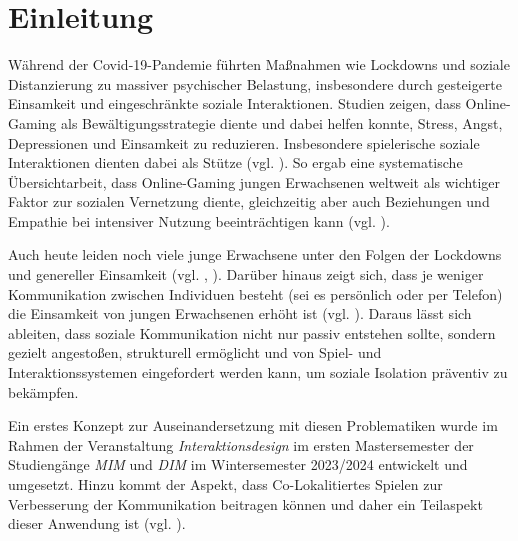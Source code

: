 \chapter{Einleitung}



Während der Covid-19-Pandemie führten Maßnahmen wie Lockdowns und soziale Distanzierung zu massiver psychischer Belastung, insbesondere durch gesteigerte Einsamkeit und eingeschränkte soziale Interaktionen. Studien zeigen, dass Online-Gaming als Bewältigungsstrategie diente und dabei helfen konnte, Stress, Angst, Depressionen und Einsamkeit zu reduzieren. Insbesondere spielerische soziale Interaktionen dienten dabei als Stütze (vgl. \cite{lewinson_gaming_2023}). So ergab eine systematische Übersichtarbeit, dass Online-Gaming jungen Erwachsenen weltweit als wichtiger Faktor zur sozialen Vernetzung diente, gleichzeitig aber auch Beziehungen und Empathie bei intensiver Nutzung beeinträchtigen kann (vgl. \cite{park_global_2025}). 

Auch heute leiden noch viele junge Erwachsene unter den Folgen der Lockdowns und genereller Einsamkeit (vgl. \cite{peer_junge_2024}, \cite{noauthor_einsamkeitsreport_2024}). Darüber hinaus zeigt sich, dass je weniger Kommunikation zwischen Individuen besteht (sei es persönlich oder per Telefon) die Einsamkeit von jungen Erwachsenen erhöht ist (vgl. \cite[S. 3]{sakurai_who_2021}). Daraus lässt sich ableiten, dass soziale Kommunikation nicht nur passiv entstehen sollte, sondern gezielt angestoßen, strukturell ermöglicht und von Spiel- und Interaktionssystemen eingefordert werden kann, um soziale Isolation präventiv zu bekämpfen. 

Ein erstes Konzept zur Auseinandersetzung mit diesen Problematiken wurde im Rahmen der Veranstaltung \emph{Interaktionsdesign} im ersten Mastersemester der Studiengänge\emph{ \ac{MIM}} und \emph{\ac{DIM}} im Wintersemester 2023/2024 entwickelt und umgesetzt. Hinzu kommt der Aspekt, dass Co-Lokalitiertes Spielen zur Verbesserung der Kommunikation beitragen können und daher ein Teilaspekt dieser Anwendung ist (vgl. \cite[S. 9]{goddard_designing_2016}).

